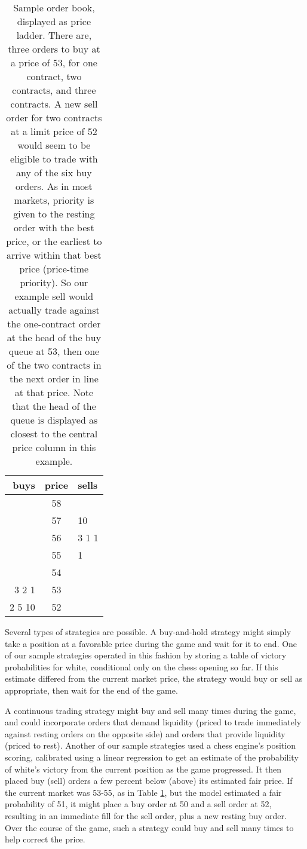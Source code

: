 \documentclass{article}
\begin{document}
\begin{table}[ht]
\centering
\begin{tabular}{r c l}
\hline\hline
buys & price & sells \\
\hline
            & 58 &            \\
            & 57 & 10         \\
            & 56 & 3 1 1      \\
            & 55 & 1          \\
            & 54 &            \\
      3 2 1 & 53 &            \\
     2 5 10 & 52 &            \\
\hline
\end{tabular}
\label{table:book} %
\caption{Sample order book, displayed as price ladder. There are, three orders to buy at a price of
  53, for one contract, two contracts, and three contracts. A new sell order for two contracts at a
  limit price of 52 would seem to be eligible to trade with any of the six buy orders. As in most
  markets, priority is given to the resting order with the best price, or the earliest to arrive
  within that best price (price-time priority). So our example sell would actually trade against the
  one-contract order at the head of the buy queue at 53, then one of the two contracts in the next
  order in line at that price. Note that the head of the queue is displayed as closest to the
  central price column in this example.}
\end{table}

Several types of strategies are possible. A buy-and-hold strategy might simply take a position at a
favorable price during the game and wait for it to end. One of our sample strategies operated in
this fashion by storing a table of victory probabilities for white, conditional only on the chess
opening so far. If this estimate differed from the current market price, the strategy would buy or
sell as appropriate, then wait for the end of the game.

A continuous trading strategy might buy and sell many times during the game, and could incorporate
orders that demand liquidity (priced to trade immediately against resting orders on the opposite
side) and orders that provide liquidity (priced to rest). Another of our sample strategies used a
chess engine's position scoring, calibrated using a linear regression to get an estimate of the
probability of white's victory from the current position as the game progressed. It then placed buy
(sell) orders a few percent below (above) its estimated fair price. If the current market was 53-55,
as in Table \ref{table:book}, but the model estimated a fair probability of 51, it might place a buy
order at 50 and a sell order at 52, resulting in an immediate fill for the sell order, plus a new
resting buy order. Over the course of the game, such a strategy could buy and sell many times to
help correct the price.
\end{document}
